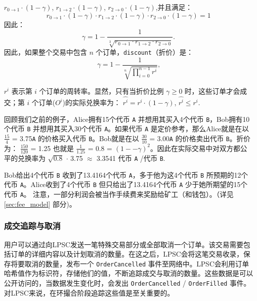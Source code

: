 \documentclass[UTF8]{ctexart}
\begin{document}
\begin{multicols}{2}
$r_{0\rightarrow 1} \cdot (1-\gamma)$, $r_{1\rightarrow 2} \cdot (1-\gamma)$, $r_{2 \rightarrow 0} \cdot (1-\gamma)$,并且满足： 
\begin{equation}
r_{0\rightarrow 1} \cdot (1-\gamma)\cdot r_{1\rightarrow 2} \cdot (1-\gamma) \cdot r_{2 \rightarrow 0} \cdot (1-\gamma) = 1
\end{equation}
因此： 
\begin{equation}
\gamma = 1- \frac{1}{\sqrt[3]{r_{0\rightarrow 1} \cdot r_{1\rightarrow 2} \cdot r_{2\rightarrow 0}}}\text{.}
\end{equation}
因此，如果整个交易中包含 $n$ 个订单，\texttt{discount}（折价）是：
\begin{equation}
\gamma = 1- \frac{1}{\sqrt[n]{\prod_{i=0}^{n-1} r^i}} \text{,}
\end{equation}

$r^i$ 表示第 $i$ 个订单的周转率。显然，只有当折价比例 $\gamma \ge 0$ 时，这些订单才会成交；第 $i$ 个订单($O^i$)的实际兑换率为： $\hat{r^i} = r^i \cdot (1-\gamma)$, $\hat{r^i}\le r^i$.

回顾我们之前的例子，Alice拥有15个代币 \verb|A| 并想用其买入4个代币 \verb|B|，Bob拥有10个代币 \verb|B| 并想用其买入30个代币 \verb|A|。如果代币 \verb|A| 是定价参考，那么Alice就是在以 $\frac{15}{4}$ = 3.75\verb|A| 的价格买入代币 \verb|B|。Bob就是在以 $\frac{30}{10}$ = 3.00\verb|A| 的价格卖出代币 \verb|B|。折价为： $\frac{150}{120}$ = 1.25 也就是 $\frac{1}{1.25}$ = 0.8 = $(1 −- \gamma)^2$。因此在实际交易中对双方都公平的兑换率为 $\sqrt{0.8}$ $\cdot$ 3.75 $\approx$ 3.3541 代币 \verb|A| /代币 \verb|B|.

Bob给出4个代币 \verb|B| 收到了13.4164个代币 \verb|A|，多于他为这4个代币 \verb|B| 所预期的12个代币 \verb|A|。Alice收到了4个代币 \verb|B| 但只给出了13.4164个代币 \verb|A| 少于她所期望的15个代币 \verb|A|。
注意，一部分利润会被当作手续费来奖励给矿工（和钱包）。（详见 \ref{sec:fee_model} 部分)。


\subsubsection{成交追踪与取消}

用户可以通过向LPSC发送一笔特殊交易部分或全部取消一个订单。该交易需要包括订单的详细内容以及计划取消的数量。在这之后，LPSC会将这笔交易收录，保存将要取消的数量，发布一个 \verb|OrderCancelled| 事件至网络中。LPSC会利用订单哈希值作为标识符，存储他们的值，不断追踪成交与取消的数量。这些数据是可以公开访问的，当数据发生变化时，会发出 \verb|OrderCancelled| / \verb|OrderFilled| 事件。对LPSC来说，在环撮合阶段追踪这些值是至关重要的。


\end{multicols}
\end{document}
